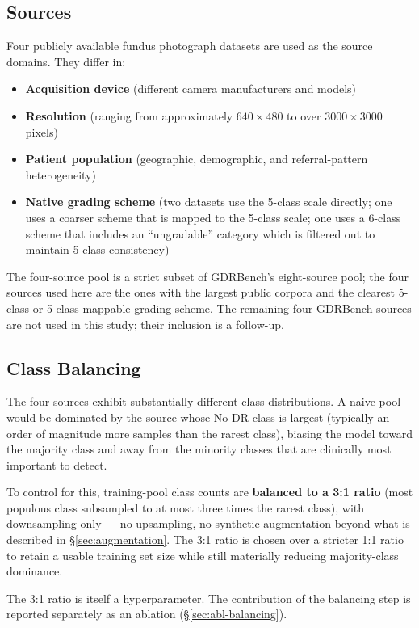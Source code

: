 \documentclass[11pt]{article}
\begin{document}
\subsection{Sources}
Four publicly available fundus photograph datasets are used as the source domains. They differ in:
\begin{itemize}[leftmargin=*, topsep=0pt]
  \item \textbf{Acquisition device} (different camera manufacturers and models)
  \item \textbf{Resolution} (ranging from approximately $640\times 480$ to over $3000\times 3000$ pixels)
  \item \textbf{Patient population} (geographic, demographic, and referral-pattern heterogeneity)
  \item \textbf{Native grading scheme} (two datasets use the 5-class scale directly; one uses a coarser scheme that is mapped to the 5-class scale; one uses a 6-class scheme that includes an ``ungradable'' category which is filtered out to maintain 5-class consistency)
\end{itemize}

The four-source pool is a strict subset of GDRBench's eight-source pool; the four sources used here are the ones with the largest public corpora and the clearest 5-class or 5-class-mappable grading scheme. The remaining four GDRBench sources are not used in this study; their inclusion is a follow-up.

\subsection{Class Balancing}
The four sources exhibit substantially different class distributions. A naive pool would be dominated by the source whose No-DR class is largest (typically an order of magnitude more samples than the rarest class), biasing the model toward the majority class and away from the minority classes that are clinically most important to detect.

To control for this, training-pool class counts are \textbf{balanced to a 3:1 ratio} (most populous class subsampled to at most three times the rarest class), with downsampling only --- no upsampling, no synthetic augmentation beyond what is described in \S\ref{sec:augmentation}. The 3:1 ratio is chosen over a stricter 1:1 ratio to retain a usable training set size while still materially reducing majority-class dominance.

The 3:1 ratio is itself a hyperparameter. The contribution of the balancing step is reported separately as an ablation (\S\ref{sec:abl-balancing}).
\end{document}
